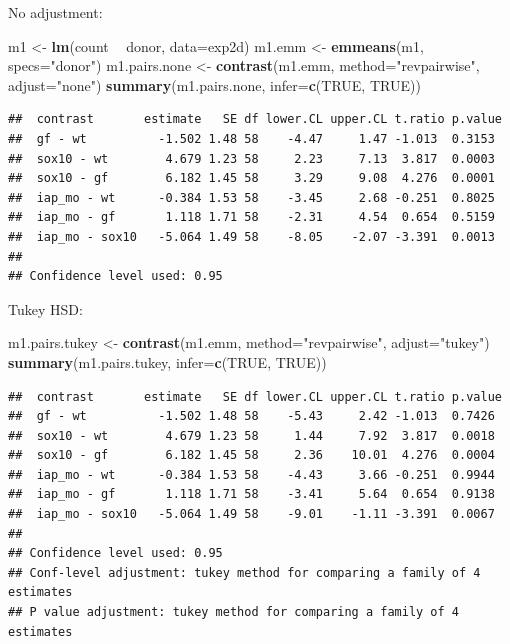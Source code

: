 \documentclass[]{book}
\newenvironment{Shaded}{\begin{snugshade}}{\end{snugshade}}
\newcommand{\DataTypeTok}[1]{\textcolor[rgb]{0.13,0.29,0.53}{#1}}
\newcommand{\KeywordTok}[1]{\textcolor[rgb]{0.13,0.29,0.53}{\textbf{#1}}}
\newcommand{\NormalTok}[1]{#1}
\newcommand{\OperatorTok}[1]{\textcolor[rgb]{0.81,0.36,0.00}{\textbf{#1}}}
\newcommand{\OtherTok}[1]{\textcolor[rgb]{0.56,0.35,0.01}{#1}}
\newcommand{\StringTok}[1]{\textcolor[rgb]{0.31,0.60,0.02}{#1}}
\begin{document}
No adjustment:

\begin{Shaded}
\begin{Highlighting}[]
\NormalTok{m1 <-}\StringTok{ }\KeywordTok{lm}\NormalTok{(count }\OperatorTok{~}\StringTok{ }\NormalTok{donor, }\DataTypeTok{data=}\NormalTok{exp2d)}
\NormalTok{m1.emm <-}\StringTok{ }\KeywordTok{emmeans}\NormalTok{(m1, }\DataTypeTok{specs=}\StringTok{"donor"}\NormalTok{)}
\NormalTok{m1.pairs.none <-}\StringTok{ }\KeywordTok{contrast}\NormalTok{(m1.emm, }\DataTypeTok{method=}\StringTok{"revpairwise"}\NormalTok{, }\DataTypeTok{adjust=}\StringTok{"none"}\NormalTok{)}
\KeywordTok{summary}\NormalTok{(m1.pairs.none, }\DataTypeTok{infer=}\KeywordTok{c}\NormalTok{(}\OtherTok{TRUE}\NormalTok{, }\OtherTok{TRUE}\NormalTok{))}
\end{Highlighting}
\end{Shaded}

\begin{verbatim}
##  contrast       estimate   SE df lower.CL upper.CL t.ratio p.value
##  gf - wt          -1.502 1.48 58    -4.47     1.47 -1.013  0.3153 
##  sox10 - wt        4.679 1.23 58     2.23     7.13  3.817  0.0003 
##  sox10 - gf        6.182 1.45 58     3.29     9.08  4.276  0.0001 
##  iap_mo - wt      -0.384 1.53 58    -3.45     2.68 -0.251  0.8025 
##  iap_mo - gf       1.118 1.71 58    -2.31     4.54  0.654  0.5159 
##  iap_mo - sox10   -5.064 1.49 58    -8.05    -2.07 -3.391  0.0013 
## 
## Confidence level used: 0.95
\end{verbatim}

Tukey HSD:

\begin{Shaded}
\begin{Highlighting}[]
\NormalTok{m1.pairs.tukey <-}\StringTok{ }\KeywordTok{contrast}\NormalTok{(m1.emm, }\DataTypeTok{method=}\StringTok{"revpairwise"}\NormalTok{, }\DataTypeTok{adjust=}\StringTok{"tukey"}\NormalTok{)}
\KeywordTok{summary}\NormalTok{(m1.pairs.tukey, }\DataTypeTok{infer=}\KeywordTok{c}\NormalTok{(}\OtherTok{TRUE}\NormalTok{, }\OtherTok{TRUE}\NormalTok{))}
\end{Highlighting}
\end{Shaded}

\begin{verbatim}
##  contrast       estimate   SE df lower.CL upper.CL t.ratio p.value
##  gf - wt          -1.502 1.48 58    -5.43     2.42 -1.013  0.7426 
##  sox10 - wt        4.679 1.23 58     1.44     7.92  3.817  0.0018 
##  sox10 - gf        6.182 1.45 58     2.36    10.01  4.276  0.0004 
##  iap_mo - wt      -0.384 1.53 58    -4.43     3.66 -0.251  0.9944 
##  iap_mo - gf       1.118 1.71 58    -3.41     5.64  0.654  0.9138 
##  iap_mo - sox10   -5.064 1.49 58    -9.01    -1.11 -3.391  0.0067 
## 
## Confidence level used: 0.95 
## Conf-level adjustment: tukey method for comparing a family of 4 estimates 
## P value adjustment: tukey method for comparing a family of 4 estimates
\end{verbatim}
\end{document}
